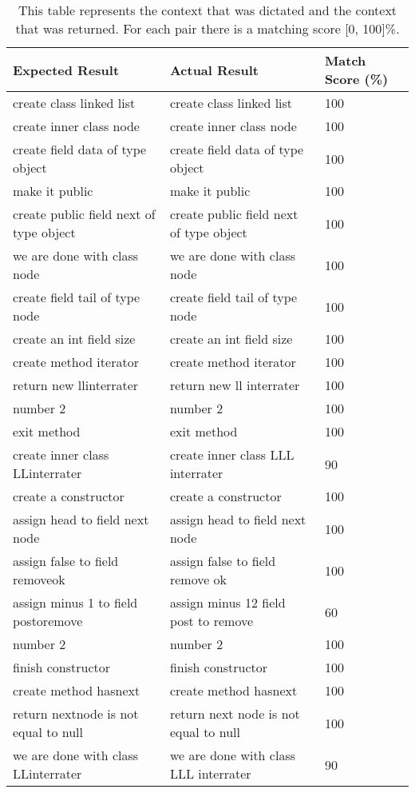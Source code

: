 \begin{table}[H]
\centering
\begin{tabular}{|p{6cm}|p{6cm}|p{2cm}|}
\hline
{\bf Expected Result} & {\bf Actual Result} & {\bf Match Score (\%)} \\ \hline
 create class linked list & create class linked list & 100 \\ \hline
 create inner class node & create inner class node & 100 \\ \hline
 create field data of type object & create field data of type object & 100 \\ \hline
 make it public & make it public & 100 \\ \hline
 create public field next of type object & create public field next of type object & 100 \\ \hline
 we are done with class node & we are done with class node & 100 \\ \hline
 create field tail of type node & create field tail of type node & 100 \\ \hline
 create an int field size & create an int field size & 100 \\ \hline
 create method iterator & create method iterator & 100 \\ \hline
 return new llinterrater & return new ll interrater & 100 \\ \hline
 number 2 & number 2 & 100 \\ \hline
 exit method & exit method & 100 \\ \hline
 create inner class LLinterrater & create inner class LLL interrater & 90 \\ \hline
 create a constructor & create a constructor & 100\\ \hline
 assign head to field next node & assign head to field next node & 100 \\ \hline
 assign false to field removeok & assign false to field remove ok & 100 \\ \hline
 assign minus 1 to field postoremove & assign minus 12 field post to remove & 60 \\ \hline
 number 2 & number 2 & 100 \\ \hline
 finish constructor & finish constructor & 100 \\ \hline
 create method hasnext & create method hasnext & 100 \\ \hline
 return nextnode is not equal to null & return next node is not equal to null & 100 \\ \hline
 we are done with class LLinterrater & we are done with class LLL interrater & 90 \\ \hline
\end{tabular}
\caption{This table represents the context that was dictated and the context that was returned. For each pair there is a matching score [0, 100]\%.}
\label{tab16}
\end{table}
